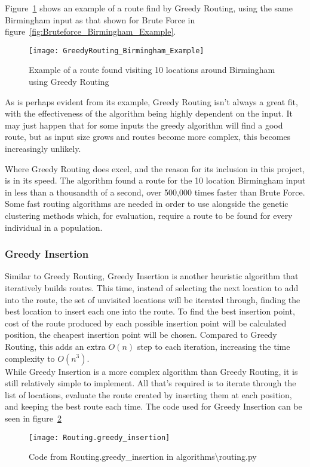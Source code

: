 \noindent
Figure~\ref{fig:GreedyRouting_Birmingham_Example} shows an example of a route find by Greedy Routing, using the same
Birmingham input as that shown for Brute Force in figure~\ref{fig:Bruteforce_Birmingham_Example}.
\begin{figure}[H]
    \centering
    \texttt{[image: GreedyRouting\_Birmingham\_Example]}
    \caption{Example of a route found visiting 10 locations around Birmingham using Greedy Routing}
    \label{fig:GreedyRouting_Birmingham_Example}
\end{figure}

\noindent
As is perhaps evident from its example, Greedy Routing isn't always a great fit, with the effectiveness of the
algorithm being highly dependent on the input.
It may just happen that for some inputs the greedy algorithm will find a good route, but as input size grows and
routes become more complex, this becomes increasingly unlikely.

Where Greedy Routing does excel, and the reason for its inclusion in this project, is in its speed.
The algorithm found a route for the 10 location Birmingham input in less than a thousandth of a second, over 500,000
times faster than Brute Force.
Some fast routing algorithms are needed in order to use alongside the genetic clustering methods which, for
evaluation, require a route to be found for every individual in a population.

\subsubsection{Greedy Insertion}\label{subsubsec:greedy-insertion}
Similar to Greedy Routing, Greedy Insertion is another heuristic algorithm that iteratively builds routes.
This time, instead of selecting the next location to add into the route, the set of unvisited locations will be iterated
through, finding the best location to insert each one into the route.
To find the best insertion point, cost of the route produced by each possible insertion point will be calculated
position, the cheapest insertion point will be chosen.
Compared to Greedy Routing, this adds an extra $O(n)$ step to each iteration, increasing the time complexity to
$O(n^3)$.\\

\noindent
While Greedy Insertion is a more complex algorithm than Greedy Routing, it is still relatively simple to implement.
All that's required is to iterate through the list of locations, evaluate the route created by inserting them at
each position, and keeping the best route each time.
The code used for Greedy Insertion can be seen in figure~\ref{fig:Routing.greedy_insertion}
\begin{figure}[H]
    \centering
    \texttt{[image: Routing.greedy\_insertion]}
    \caption{Code from Routing.greedy\_insertion in algorithms\textbackslash routing.py}
    \label{fig:Routing.greedy_insertion}
\end{figure}

